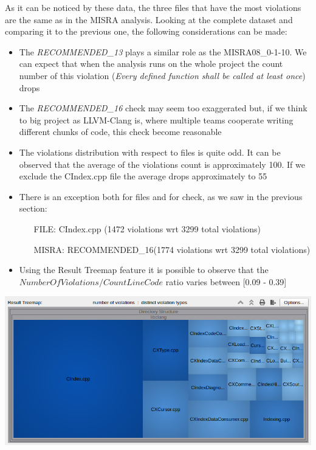 As it can be noticed by these data, the three files that have the most violations are the same as in the MISRA analysis.\newline
Looking at the complete dataset and comparing it to the previous one, the following considerations can be made:
\begin{itemize}
	\item The \textsl{RECOMMENDED\_13} plays a similar role as the MISRA08\_0-1-10. We can expect that when the analysis runs on the whole project the count number of this violation (\textsl{Every defined function shall be called at least once}) drops
	\item The \textsl{RECOMMENDED\_16} check may seem too exaggerated but, if we think to big project as LLVM-Clang is, where multiple teams cooperate writing different chunks of code, this check become reasonable
	\item The violations distribution with respect to files is quite odd. It can be observed that the average of the violations count is approximately 100. If we exclude the CIndex.cpp file the average drops approximately to 55
	\item There is an exception both for files and for check, as we saw in the previous section:
	\begin{itemize}
		\item[FILE: ] CIndex.cpp (1472 violations wrt 3299 total violations)
		\item[MISRA: ] RECOMMENDED\_16(1774 violations wrt 3299 total violations)
	\end{itemize}
	\item Using the Result Treemap feature it is possible to observe that the $NumberOfViolations/CountLineCode$ ratio varies between [0.09 - 0.39]
\end{itemize}

\vspace{1cm}
\begin{minipage}{\linewidth}
	\includegraphics[width=\textwidth]{img/SciToolsViolationsCount.png}
\end{minipage}
\pagebreak


